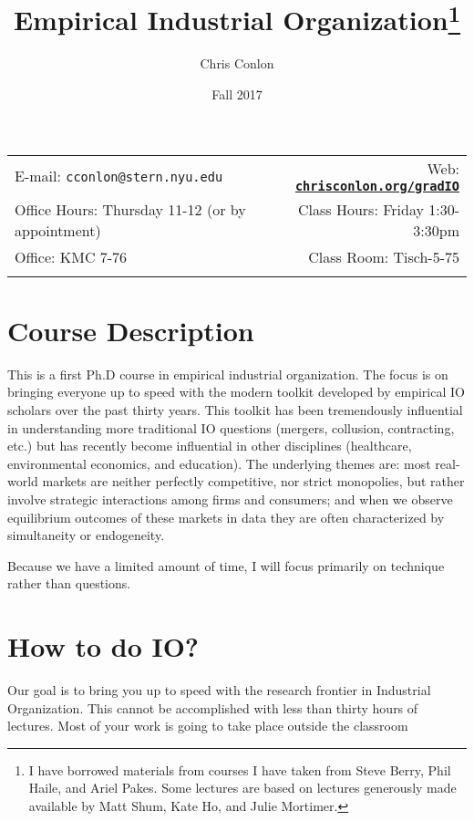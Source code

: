 \documentclass[11pt]{article}
\title{Empirical Industrial Organization\footnote{I have borrowed materials from courses I have taken from Steve Berry, Phil Haile, and Ariel Pakes. Some lectures are based on lectures generously made available by Matt Shum, Kate Ho, and Julie Mortimer.}}
\author{Chris Conlon}
\date{Fall 2017}
\newcommand{\blankline}{\quad\pagebreak[2]}
\begin{document}
\maketitle

\blankline

\begin{tabular*}{.93\textwidth}{@{\extracolsep{\fill}}lr}


  E-mail: \texttt{cconlon@stern.nyu.edu} & Web: \href{http://chrisconlon.org}{\tt\bf chrisconlon.org/gradIO}  \\

 Office Hours: Thursday 11-12 (or by appointment) &  Class Hours: Friday 1:30-3:30pm \\


 Office: KMC 7-76  & Class Room: Tisch-5-75 \\
&  \\
\hline
\end{tabular*}

\vspace{10 mm}

\section*{Course Description}
This is a first Ph.D course in empirical industrial organization. The focus is on bringing everyone up to speed with the modern toolkit developed by empirical IO scholars over the past thirty years. This toolkit has been tremendously influential in understanding more traditional IO questions (mergers, collusion, contracting, etc.) but has recently become influential in other disciplines (healthcare, environmental economics, and education). The underlying themes are: most real-world markets are neither perfectly competitive, nor strict monopolies, but rather involve strategic interactions among firms and consumers; and when we observe equilibrium outcomes of these markets in data they are often characterized by simultaneity or endogeneity.

Because we have a limited amount of time, I will focus primarily on technique rather than questions.

\section*{How to do IO?}
Our goal is to bring you up to speed with the research frontier in Industrial Organization. This cannot be accomplished with less than thirty hours of lectures. Most of your work is going to take place outside the classroom
\end{document}
